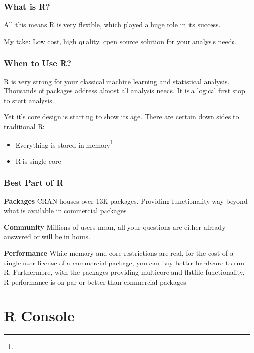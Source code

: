 \documentclass{beamer}\usepackage[]{graphicx}\usepackage[]{color}
\begin{document}
\begin{frame}
\frametitle{What is R?}

All this means R is very flexible, which played a huge role in its success.\vfill

My take: Low cost, high quality, open source solution for your analysis needs.\vfill

\end{frame}

\begin{frame}
\frametitle{When to Use R?}

R is very strong for your classical machine learning and statistical analysis. Thousands of packages address almost all analysis needs. It is a logical first stop to start analysis.\vfill

\pause 
Yet it's core design is starting to show its age. There are certain down sides to traditional R:\vfill

\begin{itemize}
\item Everything is stored in memory\footnote{}
\vspace{1em}

\item R is single core\footnotemark[1]
\end{itemize}
\vfill

\end{frame}


\begin{frame}
\frametitle{Best Part of R}

\textbf{Packages} CRAN houses over 13K packages. Providing functionality way beyond what is available in commercial packages.

\vspace*{1.5em}\textbf{Community} Millions of users mean, all your questions are either already answered or will be in hours.

\vspace*{1.5em}\textbf{Performance} While memory and core restrictions are real, for the cost of a single user license of a commercial package, you can buy better hardware to run R. Furthermore, with the packages providing multicore and flatfile functionality, R performance is on par or better than commercial packages

\end{frame}


\section{R Console}
\end{document}
